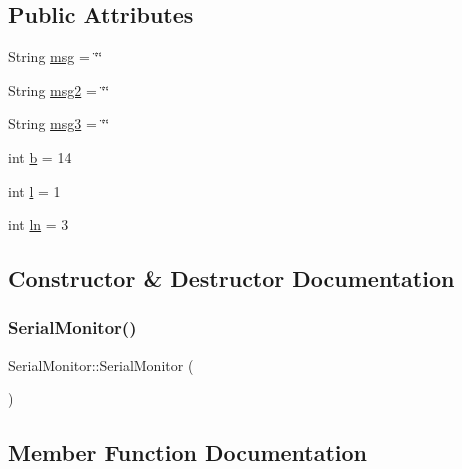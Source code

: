 \subsection*{Public Attributes}
\begin{DoxyCompactItemize}
\item 
String \hyperlink{class_serial_monitor_ad8d79dfef8beca9a49c79d70a762f11f}{msg} = \char`\"{}\char`\"{}
\item 
String \hyperlink{class_serial_monitor_a3435a73fe22d7df05cae997dc8154118}{msg2} = \char`\"{}\char`\"{}
\item 
String \hyperlink{class_serial_monitor_acb11ddb2153fc4af57e25ea0aec58991}{msg3} = \char`\"{}\char`\"{}
\item 
int \hyperlink{class_serial_monitor_a2f19a1abd632968b33a1ef708eda89d6}{b} = 14
\item 
int \hyperlink{class_serial_monitor_ae4e18850fa4b68adcba828613ac53cc7}{l} = 1
\item 
int \hyperlink{class_serial_monitor_a927d39734bc5a2f14d2410166c3ad7d8}{ln} = 3
\end{DoxyCompactItemize}


\subsection{Constructor \& Destructor Documentation}
\mbox{\label{class_serial_monitor_aab6fdc35e8940fc33fc5805f106960e1}} 
\subsubsection{\texorpdfstring{Serial\+Monitor()}{SerialMonitor()}}
{\footnotesize\ttfamily Serial\+Monitor\+::\+Serial\+Monitor (\begin{DoxyParamCaption}{ }\end{DoxyParamCaption})}



\subsection{Member Function Documentation}
\mbox{\label{class_serial_monitor_a2747038f640e76c7b822d3c1ce8a8798}} 
